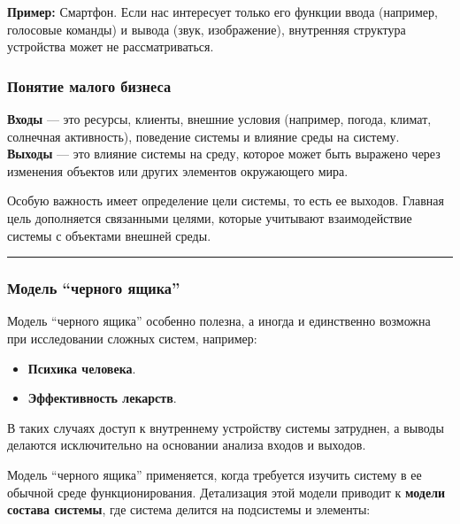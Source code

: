 \documentclass[
]{article}
\providecommand{\tightlist}{%
  \setlength{\itemsep}{0pt}\setlength{\parskip}{0pt}}
\begin{document}
\textbf{Пример:} Смартфон. Если нас интересует только его функции ввода
(например, голосовые команды) и вывода (звук, изображение), внутренняя
структура устройства может не рассматриваться.

\subsubsection{\texorpdfstring{\textbf{Понятие малого
бизнеса}}{Понятие малого бизнеса}}\label{ux43fux43eux43dux44fux442ux438ux435-ux43cux430ux43bux43eux433ux43e-ux431ux438ux437ux43dux435ux441ux430}

\textbf{Входы} --- это ресурсы, клиенты, внешние условия (например,
погода, климат, солнечная активность), поведение системы и влияние среды
на систему.\\
\textbf{Выходы} --- это влияние системы на среду, которое может быть
выражено через изменения объектов или других элементов окружающего мира.

Особую важность имеет определение цели системы, то есть ее выходов.
Главная цель дополняется связанными целями, которые учитывают
взаимодействие системы с объектами внешней среды.

\begin{center}\rule{0.5\linewidth}{0.5pt}\end{center}

\subsubsection{\texorpdfstring{\textbf{Модель ``черного
ящика''}}{Модель ``черного ящика''}}\label{ux43cux43eux434ux435ux43bux44c-ux447ux435ux440ux43dux43eux433ux43e-ux44fux449ux438ux43aux430}

Модель ``черного ящика'' особенно полезна, а иногда и единственно
возможна при исследовании сложных систем, например:

\begin{itemize}
\tightlist
\item
  \textbf{Психика человека}.
\item
  \textbf{Эффективность лекарств}.
\end{itemize}

В таких случаях доступ к внутреннему устройству системы затруднен, а
выводы делаются исключительно на основании анализа входов и выходов.

Модель ``черного ящика'' применяется, когда требуется изучить систему в
ее обычной среде функционирования. Детализация этой модели приводит к
\textbf{модели состава системы}, где система делится на подсистемы и
элементы:
\end{document}

